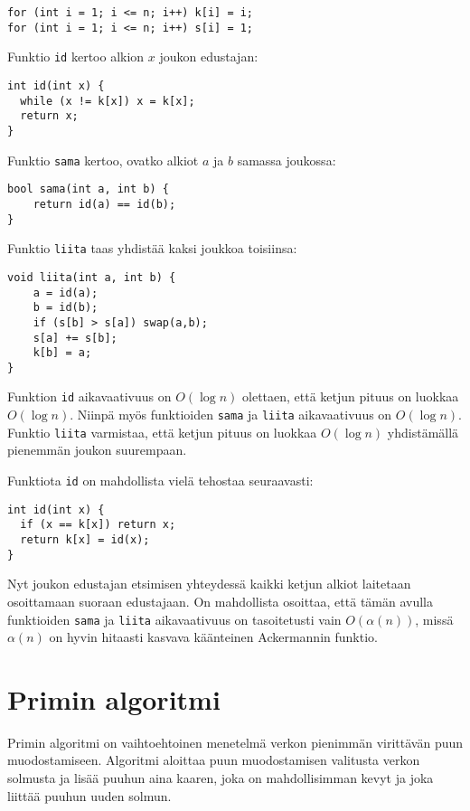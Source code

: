 \begin{lstlisting}
for (int i = 1; i <= n; i++) k[i] = i;
for (int i = 1; i <= n; i++) s[i] = 1;
\end{lstlisting}

Funktio \texttt{id} kertoo alkion $x$
joukon edustajan:

\begin{lstlisting}
int id(int x) {
  while (x != k[x]) x = k[x];
  return x;
}
\end{lstlisting}

Funktio \texttt{sama} kertoo,
ovatko alkiot $a$ ja $b$ samassa joukossa:

\begin{lstlisting}
bool sama(int a, int b) {
    return id(a) == id(b);
}
\end{lstlisting}

Funktio \texttt{liita} taas yhdistää
kaksi joukkoa toisiinsa:

\begin{lstlisting}
void liita(int a, int b) {
    a = id(a);
    b = id(b);
    if (s[b] > s[a]) swap(a,b);
    s[a] += s[b];
    k[b] = a;
}
\end{lstlisting}

Funktion \texttt{id} aikavaativuus on $O(\log n)$
olettaen, että ketjun pituus on luokkaa $O(\log n)$.
Niinpä myös funktioiden \texttt{sama} ja \texttt{liita}
aikavaativuus on $O(\log n)$.
Funktio \texttt{liita} varmistaa,
että ketjun pituus on luokkaa $O(\log n)$
yhdistämällä pienemmän joukon suurempaan.

Funktiota \texttt{id} on mahdollista vielä tehostaa
seuraavasti:

\begin{lstlisting}
int id(int x) {
  if (x == k[x]) return x;
  return k[x] = id(x);
}
\end{lstlisting}

Nyt joukon edustajan etsimisen yhteydessä kaikki ketjun
alkiot laitetaan osoittamaan suoraan edustajaan.
On mahdollista osoittaa, että tämän avulla
funktioiden \texttt{sama} ja \texttt{liita}
aikavaativuus on tasoitetusti
vain $O(\alpha(n))$, missä $\alpha(n)$ on
hyvin hitaasti kasvava käänteinen Ackermannin funktio.

\section{Primin algoritmi}


Primin algoritmi on vaihtoehtoinen menetelmä
verkon pienimmän virittävän puun muodostamiseen.
Algoritmi aloittaa puun muodostamisen valitusta
verkon solmusta ja lisää puuhun aina kaaren,
joka on mahdollisimman kevyt ja joka
liittää puuhun uuden solmun.

